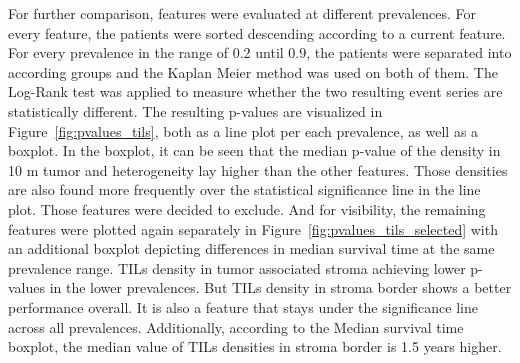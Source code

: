 For further comparison, features were evaluated at different prevalences.
For every feature, the patients were sorted descending according to a current feature.
For every prevalence in the range of 0.2 until 0.9, the patients were separated into
according groups and the Kaplan Meier method was used on both of them. The Log-Rank test
was applied to measure whether the two resulting event series are statistically different.
The resulting p-values are visualized in Figure~\ref{fig:pvalues_tils}, both as a line plot
per each prevalence, as well as a boxplot. In the boxplot, it can be seen that the median
p-value of the density in 10 \textmu m tumor and heterogeneity
lay higher than the other features. Those densities are also found more frequently
over the statistical significance line in the line plot. Those features were decided to exclude.
And for visibility, the remaining features were plotted again separately in
Figure~\ref{fig:pvalues_tils_selected} with an additional boxplot depicting differences in median
survival time at the same prevalence range. TILs density in tumor associated stroma achieving
lower p-values in the lower prevalences. But TILs density in stroma border shows a better
performance overall. It is also a feature that stays under the significance line across
all prevalences. Additionally, according to the Median survival time boxplot,
the median value of TILs densities in stroma border is 1.5 years higher.

